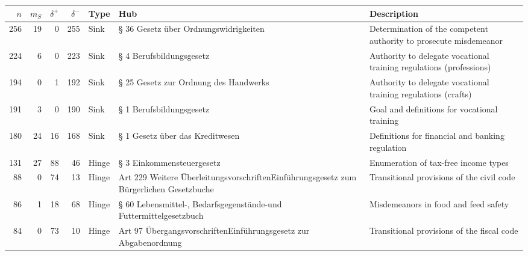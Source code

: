 \documentclass[utf8,sort&compress,table,hidelinks]{frontiersFPHY} %
\begin{document}
\begin{table}
\begin{tabular}{rrrrlp{}p{}}
\toprule
   $n$ &   $m_S$ &   $\delta^+$ &   $\delta^-$ & \textbf{Type}   & \textbf{Hub}                                                                            & \textbf{Description}   \\
\midrule
   256 &      19 &            0 &          255 & Sink            & § 36 Gesetz über Ordnungswidrigkeiten                                                   & Determination of the competent authority to prosecute misdemeanor   \\
   224 &       6 &            0 &          223 & Sink            & § 4 Berufsbildungsgesetz                                                                & Authority to delegate vocational training regulations (professions)                      \\
   194 &       0 &            1 &          192 & Sink            & § 25 Gesetz zur Ordnung des Handwerks                                                   & Authority to delegate vocational training regulations (crafts)                        \\
   191 &       3 &            0 &          190 & Sink            & § 1 Berufsbildungsgesetz                                                                & Goal and definitions for vocational training                      \\
   180 &      24 &           16 &          168 & Sink            & § 1 Gesetz über das Kreditwesen                                                         & Definitions for financial and banking regulation                       \\
   131 &      27 &           88 &           46 & Hinge           & § 3 Einkommensteuergesetz                                                               & Enumeration of tax-free income types                       \\
    88 &       0 &           74 &           13 & Hinge           & Art 229 Weitere Überleitungsvorschriften\newline Einführungsgesetz zum Bürgerlichen Gesetzbuche & Transitional provisions of the civil code                       \\
    86 &       1 &           18 &           68 & Hinge           & § 60 Lebensmittel-, Bedarfsgegenstände-\newline und Futtermittelgesetzbuch                      & Misdemeanors in food and feed safety                       \\
    84 &       0 &           73 &           10 & Hinge           & Art 97 Übergangsvorschriften\newline Einführungsgesetz zur Abgabenordnung                       & Transitional provisions of the fiscal code                       \\

\end{tabular}
\end{table}
\end{document}
